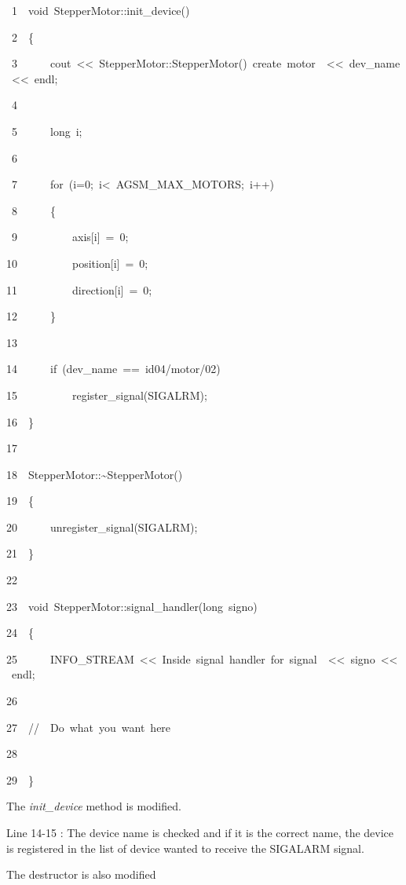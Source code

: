 
\begin{lyxcode}
~1~~void~StepperMotor::init\_device()

~2~~\{

~3~~~~~~cout~<\textcompwordmark{}<~\textquotedbl{}StepperMotor::StepperMotor()~create~motor~\textquotedbl{}~<\textcompwordmark{}<~dev\_name~<\textcompwordmark{}<~endl;

~4~~

~5~~~~~~long~i;

~6~~

~7~~~~~~for~(i=0;~i<~AGSM\_MAX\_MOTORS;~i++)

~8~~~~~~\{

~9~~~~~~~~~~axis{[}i{]}~=~0;

10~~~~~~~~~~position{[}i{]}~=~0;

11~~~~~~~~~~direction{[}i{]}~=~0;

12~~~~~~\}

13~~

14~~~~~~if~(dev\_name~==~\textquotedbl{}id04/motor/02\textquotedbl{})

15~~~~~~~~~~register\_signal(SIGALRM);

16~~\}

17~~

18~~StepperMotor::\textasciitilde{}StepperMotor()

19~~\{

20~~~~~~unregister\_signal(SIGALRM);

21~~\}

22~~

23~~void~StepperMotor::signal\_handler(long~signo)

24~~\{

25~~~~~~INFO\_STREAM~<\textcompwordmark{}<~\textquotedbl{}Inside~signal~handler~for~signal~\textquotedbl{}~<\textcompwordmark{}<~signo~<\textcompwordmark{}<~endl;

26~~

27~~//~~Do~what~you~want~here

28~~

29~~\}
\end{lyxcode}


The \emph{init\_device} method is modified.

Line 14-15 : The device name is checked and if it is the correct name,
the device is registered in the list of device wanted to receive the
SIGALARM signal.

The destructor is also modified

